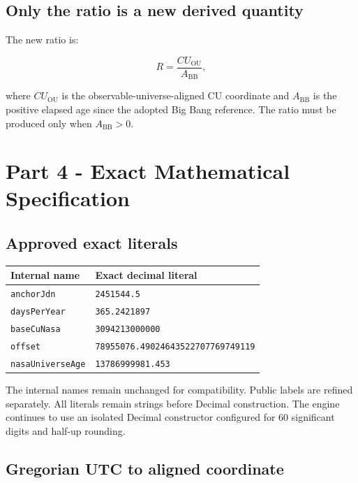 \documentclass[11pt,letterpaper]{article}
\begin{document}
\subsection{Only the ratio is a new derived quantity}

The new ratio is:

\[
R = \frac{CU_{\mathrm{OU}}}{A_{\mathrm{BB}}},
\]

where \(CU_{\mathrm{OU}}\) is the observable-universe-aligned CU coordinate and
\(A_{\mathrm{BB}}\) is the positive elapsed age since the adopted Big Bang
reference. The ratio must be produced only when \(A_{\mathrm{BB}}>0\).

\section{Part 4 - Exact Mathematical Specification}

\subsection{Approved exact literals}

\begin{tabularx}{\textwidth}{L{2.1in}Y}
\toprule
\textbf{Internal name} & \textbf{Exact decimal literal} \\
\midrule
\texttt{anchorJdn} & \texttt{2451544.5} \\
\texttt{daysPerYear} & \texttt{365.2421897} \\
\texttt{baseCuNasa} & \texttt{3094213000000} \\
\texttt{offset} & \texttt{78955076.49024643522707769749119} \\
\texttt{nasaUniverseAge} & \texttt{13786999981.453} \\
\bottomrule
\end{tabularx}

The internal names remain unchanged for compatibility. Public labels are
refined separately. All literals remain strings before Decimal construction.
The engine continues to use an isolated Decimal constructor configured for 60
significant digits and half-up rounding.

\subsection{Gregorian UTC to aligned coordinate}
\end{document}
